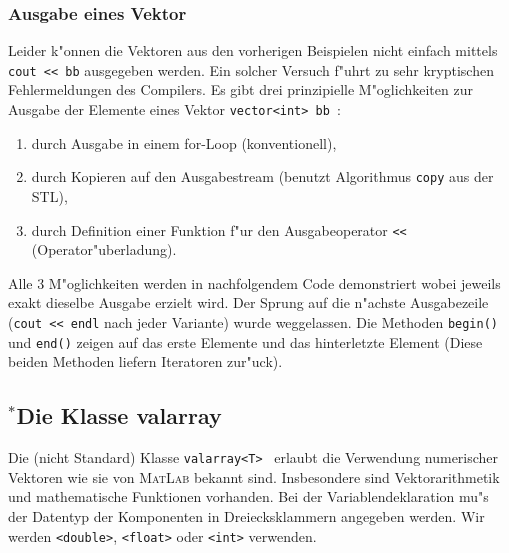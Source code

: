 \subsubsection{Ausgabe eines Vektor}
Leider k"onnen die Vektoren aus den vorherigen Beispielen nicht einfach mittels
\verb|cout << bb| ausgegeben werden. Ein solcher Versuch f"uhrt zu sehr kryptischen Fehlermeldungen
des Compilers. Es gibt drei prinzipielle M"oglichkeiten zur Ausgabe der Elemente eines
Vektor \verb|vector<int> bb|~:
\begin{enumerate}
  \item durch Ausgabe in einem \textrm{for}-Loop (konventionell),
  \item durch Kopieren auf den Ausgabestream (benutzt Algorithmus \texttt{copy} aus der STL),
  \item durch Definition einer Funktion f"ur den Ausgabeoperator \verb|<<| (Operator"uberladung).
\end{enumerate}
Alle 3 M"oglichkeiten werden in nachfolgendem Code demonstriert wobei jeweils exakt dieselbe Ausgabe
erzielt wird. Der Sprung auf die n"achste Ausgabezeile (\verb|cout << endl| nach jeder Variante)
wurde weggelassen.%
Die Methoden \verb|begin()| und \verb|end()| zeigen auf das erste Elemente und das
hinterletzte Element (Diese beiden Methoden liefern Iteratoren zur"uck).
%

\subsection{\mbox{}$^{*}$Die Klasse valarray}
\label{p:2.3.3}
Die (nicht Standard) Klasse \texttt{valarray<T>}~\cite[p.~687]{KirchPrinz:2002:OOP}
erlaubt die Verwendung numerischer Vektoren  wie sie von
\textsc{MatLab} bekannt sind. Insbesondere sind Vektorarithmetik und mathematische Funktionen vorhanden.
Bei der Variablendeklaration mu"s der Datentyp der Komponenten in
Dreiecksklammern angegeben werden. Wir werden \verb|<double>|,
\verb|<float>| oder \verb|<int>| verwenden.
%
%


























